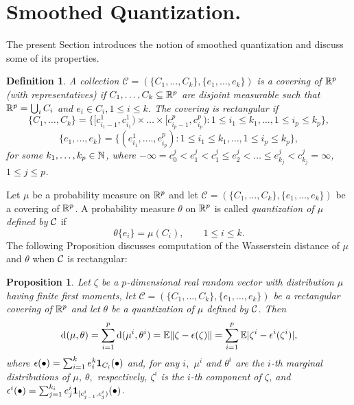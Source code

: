 \documentclass{article}              %
\newtheorem{definition}{Definition}
\newtheorem{proposition}{Proposition}
\begin{document}
\section{\label{sec:sq}Smoothed Quantization.}

The present Section introduces the notion of smoothed quantization
and discuss some of its properties. 
\begin{definition}
\label{def:cov}A collection $\mathcal{C}=(\{C_{1},\dots,C_{k}\},\{e_{1},\dots,e_{k}\})$
is a \emph{covering} \emph{of} $\mathbb{R}^{p}$ \emph{(with representatives)}
if $C_{1},\dots,C_{k}\subseteq\mathbb{R}^{p}$ are disjoint measurable such that $\mathbb{R}^{p}=\bigcup_{i}C_{i}$
and $e_{i}\in C_{i},1\leq i\leq k$. The covering is \emph{rectangular}
if 
\[
\{C_{1},\dots,C_{k}\}=\{[c_{i_{1}-1}^{1},c_{i_{1}}^{1})\times\dots\times[c_{i_{p}-1}^{p},c_{i_{p}}^{p}):1\leq i_{1}\leq k_{1},\dots,1\leq i_{p}\leq k_{p}\},
\]
\[
\{e_{1},\dots,e_{k}\}=\{(e_{i_{1}}^{1},\dots.,e_{i_{p}}^{p}):1\leq i_{1}\leq k_{1},\dots,1\leq i_{p}\leq k_{p}\},
\]
for some $k_{1},\dots,k_{p}\in\mathbb{N}$, where $-\infty=c_{0}^{j}<e_{1}^{j}<c_{1}^{j}\leq e_{2}^{j}<\dots\leq e_{k_{j}}^{j}<c_{k_{j}}^{j}=\infty$,
$1\leq j\leq p$. 
\end{definition}

Let $\mu$ be a probability measure on $\mathbb{R}^{p}$ and let $\mathcal{C}=(\{C_{1},\dots,C_{k}\},\{e_{1},\dots,e_{k}\})$
be a covering of $\mathbb{R}^{p}$. A probability measure $\theta$ on $\mathbb{R}^{p}$
is called \emph{quantization of $\mu$ defined by $\mathcal{C}$} if 
\[
\theta\{e_{i}\}=\mu(C_{i}),\qquad1\leq i\leq k.
\]
The following Proposition discusses computation of the Wasserstein distance of  $\mu$ and $\theta$
when $\mathcal{C}$ is rectangular:
\begin{proposition}
\label{prop:thesis}Let $\zeta$ be a $p$-dimensional real random
vector with distribution $\mu$ having finite first moments, let $\mathcal{C}=(\{C_{1},\dots,C_{k}\},\{e_{1},\dots,e_{k}\})$
be a rectangular covering of $\mathbb{R}^{p}$ and let $\theta$ be a quantization
of $\mu$ defined by $\mathcal{C}$. Then 
\begin{equation}
\mathrm{d}(\mu,\theta)=\sum_{i=1}^{p}\mathrm{d}(\mu^{i},\theta^{i})=\mathbb{E}\|\zeta-\epsilon(\zeta)\|=\sum_{i=1}^{p}\mathbb{E}|\zeta^{i}-\epsilon^{i}(\zeta^{i})|,\label{eq:dis2-2-1}
\end{equation}
where $\epsilon(\bullet)=\sum_{i=1}^{k}e_{i}^{k}\mathbf{1}_{C_{i}}(\bullet)$
and, for any $i,$ $\mu^{i}$ and $\theta^{i}$ are the $i$-th marginal
distributions of $\mu$, $\theta,$ respectively, $\zeta^{i}$ is
the $i$-th component of $\zeta$, and $\epsilon^{i}(\bullet)=\sum_{j=1}^{k_{i}}e_{j}^{i}\mathbf{1}_{[c_{j-1}^{i},c_{j}^{i})}(\bullet)$. 
\end{proposition}
\end{document}
